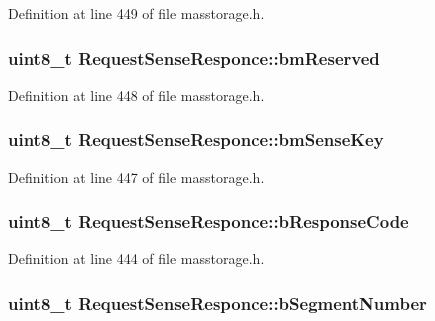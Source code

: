 \-Definition at line 449 of file masstorage.\-h.

\hypertarget{struct_request_sense_responce_ae2d8ba719fa3365271924facb832b6d5}{
\subsubsection[{bm\-Reserved}]{\setlength{\rightskip}{0pt plus 5cm}uint8\-\_\-t {\bf \-Request\-Sense\-Responce\-::bm\-Reserved}}}\label{struct_request_sense_responce_ae2d8ba719fa3365271924facb832b6d5}


\-Definition at line 448 of file masstorage.\-h.

\hypertarget{struct_request_sense_responce_affd71e9a5912c4752adb0cb108cf4118}{
\subsubsection[{bm\-Sense\-Key}]{\setlength{\rightskip}{0pt plus 5cm}uint8\-\_\-t {\bf \-Request\-Sense\-Responce\-::bm\-Sense\-Key}}}\label{struct_request_sense_responce_affd71e9a5912c4752adb0cb108cf4118}


\-Definition at line 447 of file masstorage.\-h.

\hypertarget{struct_request_sense_responce_a7db2938d24b431077a52edd1b8c48557}{
\subsubsection[{b\-Response\-Code}]{\setlength{\rightskip}{0pt plus 5cm}uint8\-\_\-t {\bf \-Request\-Sense\-Responce\-::b\-Response\-Code}}}\label{struct_request_sense_responce_a7db2938d24b431077a52edd1b8c48557}


\-Definition at line 444 of file masstorage.\-h.

\hypertarget{struct_request_sense_responce_a243e278d4598f7524e2fd48a45269af8}{
\subsubsection[{b\-Segment\-Number}]{\setlength{\rightskip}{0pt plus 5cm}uint8\-\_\-t {\bf \-Request\-Sense\-Responce\-::b\-Segment\-Number}}}\label{struct_request_sense_responce_a243e278d4598f7524e2fd48a45269af8}


